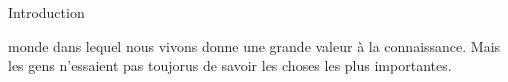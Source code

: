 
\newpage

\begin{center}
\secstyle\textls[-35] Introduction
\end{center}


 monde dans lequel nous vivons donne une grande valeur à la
 connaissance. Mais les gens n'essaient pas toujorus de savoir les choses les
 plus importantes.




